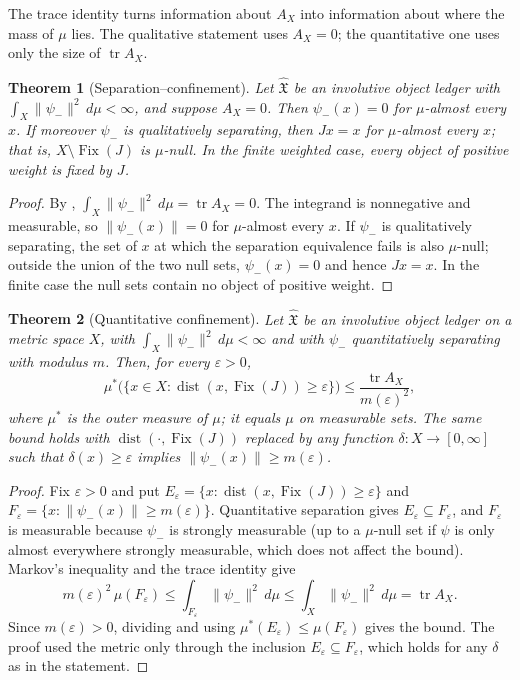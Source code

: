 \documentclass[11pt]{article}
\DeclareMathOperator{\Fix}{Fix}
\DeclareMathOperator{\dist}{dist}
\DeclareMathOperator{\trace}{tr}
\newcommand{\psim}{\psi_{-}}
\newcommand{\AX}{A_{X}}
\newcommand{\IOL}{\hat{\mathfrak{X}}}
\newtheorem{theorem}{Theorem}[section]
\theoremstyle{definition}
\begin{document}
The trace identity turns information about \(\AX\) into information
about where the mass of \(\mu\) lies.  The qualitative statement uses
\(\AX=0\); the quantitative one uses only the size of \(\trace\AX\).

\begin{theorem}[Separation--confinement]
\label{thm:duality_confinement:separation-confinement}
Let \(\IOL\) be an involutive object ledger with
\(\int_X\|\psim\|^2\,d\mu<\infty\), and suppose \(\AX=0\).  Then
\(\psim(x)=0\) for \(\mu\)-almost every \(x\).  If moreover \(\psim\)
is qualitatively separating, then \(Jx=x\) for \(\mu\)-almost every
\(x\); that is, \(X\setminus\Fix(J)\) is \(\mu\)-null.  In the finite
weighted case, every object of positive weight is fixed by \(J\).
\end{theorem}

\begin{proof}
By ,
\(\int_X\|\psim\|^2\,d\mu=\trace\AX=0\).  The integrand is nonnegative
and measurable, so \(\|\psim(x)\|=0\) for \(\mu\)-almost every \(x\).
If \(\psim\) is qualitatively separating, the set of \(x\) at which the
separation equivalence fails is also \(\mu\)-null; outside the union of
the two null sets, \(\psim(x)=0\) and hence \(Jx=x\).  In the finite
case the null sets contain no object of positive weight.
\end{proof}

\begin{theorem}[Quantitative confinement]
\label{thm:duality_confinement:quantitative-confinement}
Let \(\IOL\) be an involutive object ledger on a metric space \(X\),
with \(\int_X\|\psim\|^2\,d\mu<\infty\) and with \(\psim\)
quantitatively separating with modulus \(m\).  Then, for every
\(\varepsilon>0\),
\[
  \mu^*\bigl(\{x\in X:\dist(x,\Fix(J))\geq\varepsilon\}\bigr)
  \leq
  \frac{\trace\AX}{m(\varepsilon)^2},
\]
where \(\mu^*\) is the outer measure of \(\mu\); it equals \(\mu\) on
measurable sets.  The same bound holds with \(\dist(\cdot,\Fix(J))\)
replaced by any function \(\delta:X\to[0,\infty]\) such that
\(\delta(x)\geq\varepsilon\) implies \(\|\psim(x)\|\geq m(\varepsilon)\).
\end{theorem}

\begin{proof}
Fix \(\varepsilon>0\) and put
\(E_\varepsilon=\{x:\dist(x,\Fix(J))\geq\varepsilon\}\) and
\(F_\varepsilon=\{x:\|\psim(x)\|\geq m(\varepsilon)\}\).  Quantitative
separation gives \(E_\varepsilon\subseteq F_\varepsilon\), and
\(F_\varepsilon\) is measurable because \(\psim\) is strongly
measurable (up to a \(\mu\)-null set if \(\psi\) is only almost
everywhere strongly measurable, which does not affect the bound).  Markov's inequality \citep{Folland1999} and
the trace identity give
\[
  m(\varepsilon)^2\,\mu(F_\varepsilon)
  \leq\int_{F_\varepsilon}\|\psim\|^2\,d\mu
  \leq\int_X\|\psim\|^2\,d\mu=\trace\AX .
\]
Since \(m(\varepsilon)>0\), dividing and using
\(\mu^*(E_\varepsilon)\leq\mu(F_\varepsilon)\) gives the bound.  The
proof used the metric only through the inclusion
\(E_\varepsilon\subseteq F_\varepsilon\), which holds for any
\(\delta\) as in the statement.
\end{proof}
\end{document}
